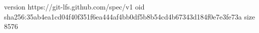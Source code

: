 version https://git-lfs.github.com/spec/v1
oid sha256:35ab4ea1cd04f40f351f6ea444af4bb0df5b8b54cd4b67343d184f0e7e3fe73a
size 8576
